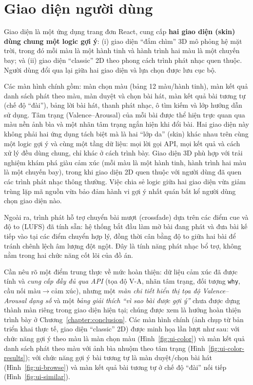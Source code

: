 \documentclass[../DoAn.tex]{subfiles}
\begin{document}
\section{Giao diện người dùng}
\label{section:ui}
Giao diện là một ứng dụng trang đơn React, cung cấp \textbf{hai giao diện (skin) dùng chung một logic gợi ý}: (i) giao diện ``đắm chìm'' 3D mô phỏng hệ mặt trời, trong đó mỗi màu là một hành tinh và hành trình hai màu là một chuyến bay; và (ii) giao diện ``classic'' 2D theo phong cách trình phát nhạc quen thuộc. Người dùng đổi qua lại giữa hai giao diện và lựa chọn được lưu cục bộ.

Các màn hình chính gồm: màn chọn màu (bảng 12 màu/hành tinh), màn kết quả danh sách phát theo màu, màn duyệt và chọn bài hát, màn kết quả bài tương tự (chế độ ``đài''), bảng lời bài hát, thanh phát nhạc, ô tìm kiếm và lớp hướng dẫn sử dụng. Tâm trạng (Valence--Arousal) của mỗi bài được thể hiện trực quan qua màu nền ảnh bìa và một nhãn tâm trạng ngắn hiện khi đổi bài. Hai giao diện này không phải hai ứng dụng tách biệt mà là hai ``lớp da'' (skin) khác nhau trên cùng một logic gợi ý và cùng một tầng dữ liệu: mọi lời gọi API, mọi kết quả và cách xử lý đều dùng chung, chỉ khác ở cách trình bày. Giao diện 3D phù hợp với trải nghiệm khám phá giàu cảm xúc (mỗi màu là một hành tinh, hành trình hai màu là một chuyến bay), trong khi giao diện 2D quen thuộc với người dùng đã quen các trình phát nhạc thông thường. Việc chia sẻ logic giữa hai giao diện vừa giảm trùng lặp mã nguồn vừa bảo đảm hành vi gợi ý nhất quán bất kể người dùng chọn giao diện nào.

Ngoài ra, trình phát hỗ trợ chuyển bài mượt (crossfade) dựa trên các điểm cue và độ to (LUFS) đã tính sẵn: hệ thống bắt đầu làm mờ bài đang phát và đưa bài kế tiếp vào tại các điểm chuyển hợp lý, đồng thời cân bằng độ to giữa hai bài để tránh chênh lệch âm lượng đột ngột. Đây là tính năng phát nhạc bổ trợ, không nằm trong hai chức năng cốt lõi của đồ án.

Cần nêu rõ một điểm trung thực về mức hoàn thiện: dữ liệu cảm xúc đã được tính và \textit{cung cấp đầy đủ qua API} (tọa độ V-A, nhãn tâm trạng, đối tượng \texttt{why}, cầu nối màu$\rightarrow$cảm xúc), nhưng một \textit{màn chi tiết hiển thị tọa độ Valence--Arousal dạng số} và một \textit{bảng giải thích ``vì sao bài được gợi ý''} chưa được dựng thành màn riêng trong giao diện hiện tại; chúng được xem là hướng hoàn thiện trình bày ở Chương~\ref{chapter:conclusion}. Các màn hình chính (ảnh chụp từ bản triển khai thực tế, giao diện ``classic'' 2D) được minh họa lần lượt như sau: với chức năng gợi ý theo màu là màn chọn màu (Hình~\ref{fig:ui-color}) và màn kết quả danh sách phát theo màu với ảnh bìa nhuộm theo tâm trạng (Hình~\ref{fig:ui-color-results}); với chức năng gợi ý bài tương tự là màn duyệt/chọn bài hát (Hình~\ref{fig:ui-browse}) và màn kết quả bài tương tự ở chế độ ``đài'' nối tiếp (Hình~\ref{fig:ui-similar}).
\end{document}
